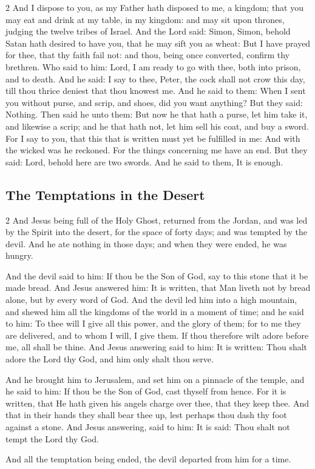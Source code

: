 \begin{multicols}{2}
And I dispose to you, as my Father hath disposed to me, a kingdom; that you may eat and drink at my table, in my kingdom: and may sit upon thrones, judging the twelve tribes of Israel. And the Lord said: Simon, Simon, behold Satan hath desired to have you, that he may sift you as wheat: But I have prayed for thee, that thy faith fail not: and thou, being once converted, confirm thy brethren. Who said to him: Lord, I am ready to go with thee, both into prison, and to death. And he said: I say to thee, Peter, the cock shall not crow this day, till thou thrice deniest that thou knowest me. And he said to them: When I sent you without purse, and scrip, and shoes, did you want anything? But they said: Nothing. Then said he unto them: But now he that hath a purse, let him take it, and likewise a scrip; and he that hath not, let him sell his coat, and buy a sword. For I say to you, that this that is written must yet be fulfilled in me: And with the wicked was he reckoned. For the things concerning me have an end. But they said: Lord, behold here are two swords. And he said to them, It is enough. 
\end{multicols}

\subsection{The Temptations in the Desert}

\begin{multicols}{2}\small
And Jesus being full of the Holy Ghost, returned from the Jordan, and was led by the Spirit into the desert, for the space of forty days; and was tempted by the devil. And he ate nothing in those days; and when they were ended, he was hungry.

And the devil said to him: If thou be the Son of God, say to this stone that it be made bread. And Jesus answered him: It is written, that Man liveth not by bread alone, but by every word of God.  And the devil led him into a high mountain, and shewed him all the kingdoms of the world in a moment of time; and he said to him: To thee will I give all this power, and the glory of them; for to me they are delivered, and to whom I will, I give them. If thou therefore wilt adore before me, all shall be thine. And Jesus answering said to him: It is written: Thou shalt adore the Lord thy God, and him only shalt thou serve.

And he brought him to Jerusalem, and set him on a pinnacle of the temple, and he said to him: If thou be the Son of God, cast thyself from hence. For it is written, that He hath given his angels charge over thee, that they keep thee. And that in their hands they shall bear thee up, lest perhaps thou dash thy foot against a stone. And Jesus answering, said to him: It is said: Thou shalt not tempt the Lord thy God.

And all the temptation being ended, the devil departed from him for a time.

\end{multicols}

